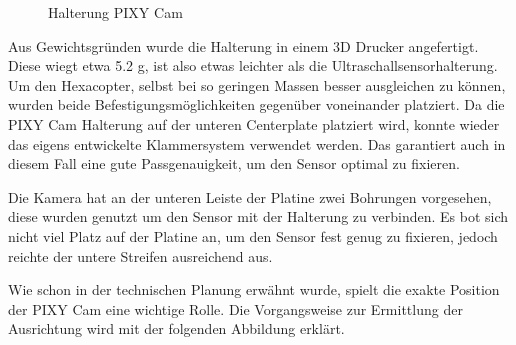 			\begin{figure}[thb]
				\begin{centering}
				\par\end{centering}
				\caption{Halterung PIXY Cam}
				\label{Halterung_PIXY}
			\end{figure}

	Aus Gewichtsgründen wurde die Halterung in einem 3D Drucker angefertigt.
	Diese wiegt etwa 5.2 g, ist also etwas leichter als die Ultraschallsensorhalterung.
	Um den Hexacopter, selbst bei so geringen Massen besser ausgleichen zu können, wurden beide Befestigungsmöglichkeiten gegenüber voneinander platziert.
	Da die PIXY Cam Halterung auf der unteren Centerplate platziert wird, konnte wieder das eigens entwickelte Klammersystem verwendet werden.
	Das garantiert auch in diesem Fall eine gute Passgenauigkeit, um den Sensor optimal zu fixieren.

	Die Kamera hat an der unteren Leiste der Platine zwei Bohrungen vorgesehen, diese wurden genutzt um den Sensor mit der Halterung zu verbinden.
	Es bot sich nicht viel Platz auf der Platine an, um den Sensor fest genug zu fixieren, jedoch reichte der untere Streifen ausreichend aus.

	Wie schon in der technischen Planung erwähnt wurde, spielt die exakte Position der PIXY Cam eine wichtige Rolle.
	Die Vorgangsweise zur Ermittlung der Ausrichtung wird mit der folgenden Abbildung erklärt.

